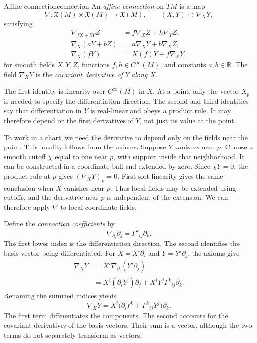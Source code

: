 \documentclass[11pt,a4paper]{article}
\numberwithin{equation}{section}
\newcommand{\R}{\mathbb R}
\newcommand{\Cinf}{C^\infty}
\newcommand{\X}{\mathfrak X}
\begin{document}
\begin{definition}{Affine connection}{connection}
An \emph{affine connection} on \(TM\) is a map
\[
 \nabla:\X(M)\times\X(M)\longrightarrow\X(M),
 \qquad (X,Y)\longmapsto\nabla_XY,
\]
satisfying
\[
 \begin{aligned}
 \nabla_{fX+hY}Z&=f\nabla_XZ+h\nabla_YZ,\\
 \nabla_X(aY+bZ)&=a\nabla_XY+b\nabla_XZ,\\
 \nabla_X(fY)&=X(f)Y+f\nabla_XY,
 \end{aligned}
\]
for smooth fields \(X,Y,Z\), functions \(f,h\in\Cinf(M)\), and constants
\(a,b\in\R\). The field \(\nabla_XY\) is the \emph{covariant derivative
of \(Y\) along \(X\)}.
\end{definition}

The first identity is linearity over \(\Cinf(M)\) in \(X\). At a point,
only the vector \(X_p\) is needed to specify the differentiation
direction. The second and third identities say that differentiation in
\(Y\) is real-linear and obeys a product rule. It may therefore depend
on the first derivatives of \(Y\), not just its value at the point.

To work in a chart, we need the derivative to depend only on the fields
near the point. This locality follows from the axioms. Suppose \(Y\)
vanishes near \(p\). Choose a smooth cutoff \(\chi\) equal to one near
\(p\), with support inside that neighborhood. It can be constructed in
a coordinate ball and extended by zero. Since \(\chi Y=0\), the product
rule at \(p\) gives \((\nabla_XY)_p=0\). First-slot linearity gives
the same conclusion when \(X\) vanishes near \(p\). Thus local fields
may be extended using cutoffs, and the derivative near \(p\) is
independent of the extension. We can therefore apply \(\nabla\) to
local coordinate fields.

Define the \emph{connection coefficients} by
\begin{equation}
 \nabla_{\partial_i}\partial_j=\Gamma^k{}_{ij}\partial_k.
 \label{eq:gamma-convention}
\end{equation}
The first lower index is the differentiation direction. The second
identifies the basis vector being differentiated. For
\(X=X^i\partial_i\) and \(Y=Y^j\partial_j\), the axioms give
\[
 \begin{aligned}
 \nabla_XY
 &=X^i\nabla_{\partial_i}(Y^j\partial_j)\\
 &=X^i(\partial_iY^j)\partial_j
   +X^iY^j\Gamma^k{}_{ij}\partial_k.
 \end{aligned}
\]
Renaming the summed indices yields
\begin{equation}
 \nabla_XY
 =X^i\bigl(\partial_iY^k+\Gamma^k{}_{ij}Y^j\bigr)\partial_k.
 \label{eq:covariant-vector}
\end{equation}
The first term differentiates the components. The second accounts for
the covariant derivatives of the basis vectors. Their sum is a vector,
although the two terms do not separately transform as vectors.
\end{document}
